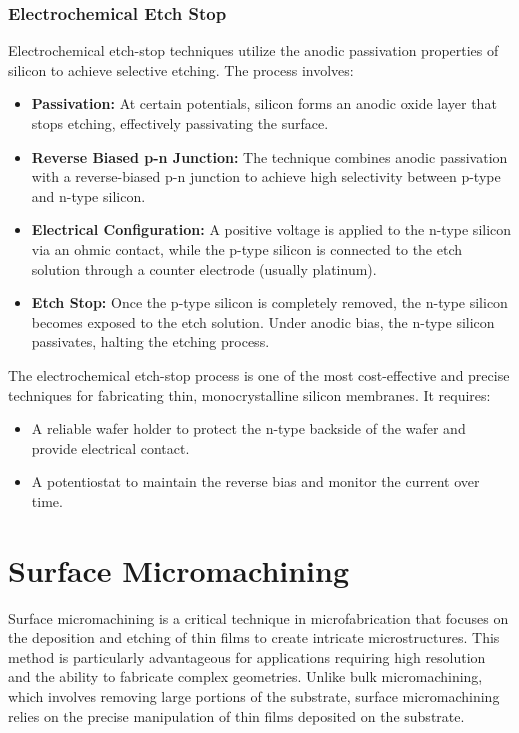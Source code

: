 \documentclass{report}
\begin{document}
\subsubsection{Electrochemical Etch Stop}
Electrochemical etch-stop techniques utilize the anodic passivation properties of silicon to achieve selective etching. The process involves:
\begin{itemize}
    \item \textbf{Passivation:} At certain potentials, silicon forms an anodic oxide layer that stops etching, effectively passivating the surface.
    \item \textbf{Reverse Biased p-n Junction:} The technique combines anodic passivation with a reverse-biased p-n junction to achieve high selectivity between p-type and n-type silicon.
    \item \textbf{Electrical Configuration:} A positive voltage is applied to the n-type silicon via an ohmic contact, while the p-type silicon is connected to the etch solution through a counter electrode (usually platinum).
    \item \textbf{Etch Stop:} Once the p-type silicon is completely removed, the n-type silicon becomes exposed to the etch solution. Under anodic bias, the n-type silicon passivates, halting the etching process.
\end{itemize}

The electrochemical etch-stop process is one of the most cost-effective and precise techniques for fabricating thin, monocrystalline silicon membranes. It requires:
\begin{itemize}
    \item A reliable wafer holder to protect the n-type backside of the wafer and provide electrical contact.
    \item A potentiostat to maintain the reverse bias and monitor the current over time.
\end{itemize}

\section{Surface Micromachining}
Surface micromachining is a critical technique in microfabrication that focuses on the deposition and etching of thin films to create intricate microstructures. This method is particularly advantageous for applications requiring high resolution and the ability to fabricate complex geometries. Unlike bulk micromachining, which involves removing large portions of the substrate, surface micromachining relies on the precise manipulation of thin films deposited on the substrate.
\end{document}
